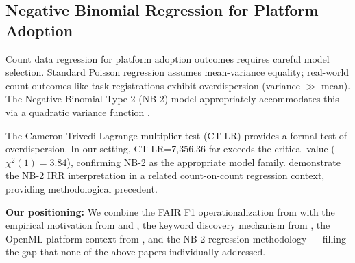 \subsection{Negative Binomial Regression for Platform Adoption}

Count data regression for platform adoption outcomes requires careful model selection. Standard Poisson regression assumes mean-variance equality; real-world count outcomes like task registrations exhibit overdispersion (variance $\gg$ mean). The Negative Binomial Type 2 (NB-2) model appropriately accommodates this via a quadratic variance function \citep{CameronTrivedi1986,CameronTrivedi2013}.

The Cameron-Trivedi Lagrange multiplier test (CT LR) provides a formal test of overdispersion. In our setting, CT LR=7,356.36 far exceeds the critical value ($\chi^2(1)=3.84$), confirming NB-2 as the appropriate model family. \citet{Cabansag2026Bayesian} demonstrate the NB-2 IRR interpretation in a related count-on-count regression context, providing methodological precedent.

\textbf{Our positioning:} We combine the FAIR F1 operationalization from \citet{Wilkinson2016FAIR} with the empirical motivation from \citet{Yang2024Navigating} and \citet{Lachmuth2025BonaRes}, the keyword discovery mechanism from \citet{Chapman2019Dataset}, the OpenML platform context from \citet{Vanschoren2014OpenML}, and the NB-2 regression methodology --- filling the gap that none of the above papers individually addressed.

